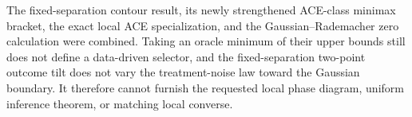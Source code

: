 The fixed-separation contour result, its newly strengthened ACE-class minimax bracket, the exact local ACE specialization, and the Gaussian--Rademacher zero calculation were combined. Taking an oracle minimum of their upper bounds still does not define a data-driven selector, and the fixed-separation two-point outcome tilt does not vary the treatment-noise law toward the Gaussian boundary. It therefore cannot furnish the requested local phase diagram, uniform inference theorem, or matching local converse.